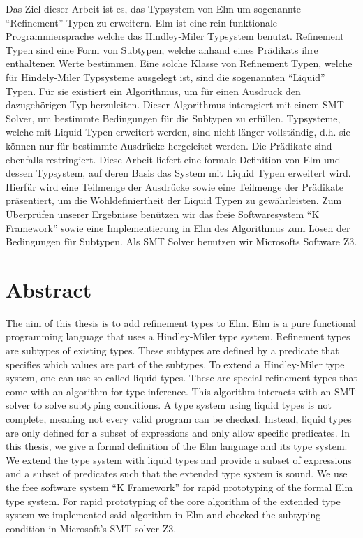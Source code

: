 Das Ziel dieser Arbeit ist es, das Typsystem von Elm um sogenannte \enquote{Refinement} Typen zu erweitern. Elm ist eine rein funktionale Programmiersprache welche das Hindley-Miler Typsystem benutzt. Refinement Typen sind eine Form von Subtypen, welche anhand eines Prädikats ihre enthaltenen Werte bestimmen. Eine solche Klasse von Refinement Typen, welche für Hindely-Miler Typsysteme ausgelegt ist, sind die sogenannten \enquote{Liquid} Typen. Für sie existiert ein Algorithmus, um für einen Ausdruck den dazugehörigen Typ herzuleiten. Dieser Algorithmus interagiert mit einem SMT Solver, um bestimmte Bedingungen für die Subtypen zu erfüllen. Typsysteme, welche mit Liquid Typen erweitert werden, sind nicht länger vollständig, d.h. sie können nur für bestimmte Ausdrücke hergeleitet werden. Die Prädikate sind ebenfalls restringiert.
Diese Arbeit liefert eine formale Definition von Elm und dessen Typsystem, auf deren Basis das System mit Liquid Typen erweitert wird. Hierfür wird eine Teilmenge der Ausdrücke sowie eine Teilmenge der Prädikate präsentiert, um die Wohldefiniertheit der Liquid Typen zu gewährleisten. Zum Überprüfen unserer Ergebnisse benützen wir das freie Softwaresystem \enquote{K Framework} sowie eine Implementierung in Elm des Algorithmus zum Lösen der Bedingungen für Subtypen. Als SMT Solver benutzen wir Microsofts Software Z3.
\newpage

\section*{Abstract}

The aim of this thesis is to add refinement types to Elm. Elm is a pure functional programming language that uses a Hindley-Miler type system. Refinement types are subtypes of existing types. These subtypes are defined by a predicate that specifies which values are part of the subtypes. To extend a Hindley-Miler type system, one can use so-called liquid types. These are special refinement types that come with an algorithm for type inference. This algorithm interacts with an SMT solver to solve subtyping conditions. A type system using liquid types is not complete, meaning not every valid program can be checked. Instead, liquid types are only defined for a subset of expressions and only allow specific predicates.
In this thesis, we give a formal definition of the Elm language and its type system. We extend the type system with liquid types and provide a subset of expressions and a subset of predicates such that the extended type system is sound. We use the free software system \enquote{K Framework} for rapid prototyping of the formal Elm type system. For rapid prototyping of the core algorithm of the extended type system we implemented said algorithm in Elm and checked the subtyping condition in Microsoft's SMT solver Z3.

